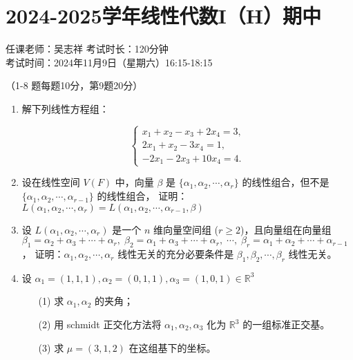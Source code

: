 \section*{2024-2025学年线性代数I（H）期中}

\begin{center}
    任课老师：吴志祥\hspace{4em} 考试时长：120分钟 \\
    考试时间：2024年11月9日（星期六）16:15-18:15
\end{center}

（1-8 题每题10分，第9题20分）

\begin{enumerate}
    \item 解下列线性方程组：

    \[
        \begin{cases}
        x_1 + x_2 - x_3 + 2x_4 = 3, \\
        2x_1 + x_2 - 3x_4 = 1, \\
        -2x_1 - 2x_3 + 10x_4 = 4.
        \end{cases}
    \]

    \item 设在线性空间 \(V(F)\) 中，向量 \(\beta\) 是 \(\{\alpha_1,\alpha_2,\cdots,\alpha_r\}\) 的线性组合，但不是 \(\{\alpha_1,\alpha_2,\cdots,\alpha_{r-1}\}\) 的线性组合，
    证明：\(L(\alpha_1,\alpha_2,\cdots,\alpha_r)=L(\alpha_1,\alpha_2,\cdots,\alpha_{r-1},\beta)\)

    \item 设 \(L(\alpha_1,\alpha_2,\cdots,\alpha_r)\) 是一个 \(n\) 维向量空间组 (\(r\geq2\))，且向量组在向量组
    \(
    \beta_1 = \alpha_2 + \alpha_3 + \cdots + \alpha_r, \;
    \beta_2 = \alpha_1 + \alpha_3 + \cdots + \alpha_r, \;
    \cdots ,\;
    \beta_r = \alpha_1 + \alpha_2 + \cdots + \alpha_{r-1}
    \)，
    证明：\(\alpha_1,\alpha_2,\cdots,\alpha_r\) 线性无关的充分必要条件是 \(\beta_1,\beta_2,\cdots,\beta_r\) 线性无关。

    \item 设 \(\alpha_1=(1,1,1),\alpha_2=(0,1,1),\alpha_3=(1,0,1)\in\mathbb{R}^3\)
    \begin{enumerate}
        \item[(1)] 求 \(\alpha_1,\alpha_2\) 的夹角；
        \item[(2)] 用 schmidt 正交化方法将 \(\alpha_1,\alpha_2,\alpha_3\) 化为 \(\mathbb{R}^3\) 的一组标准正交基。
        \item[(3)] 求 \(\mu=(3,1,2)\) 在这组基下的坐标。
    \end{enumerate}


\end{enumerate}
